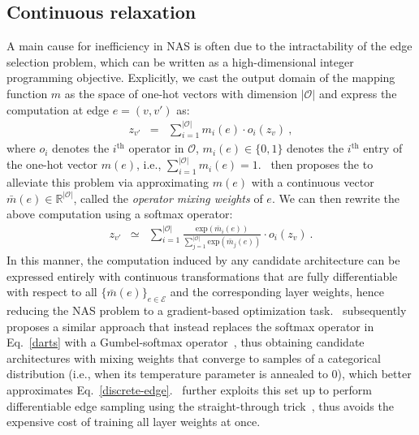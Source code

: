 \subsection{Continuous relaxation}
A main cause for inefficiency in NAS is often due to the intractability of the edge selection problem, which can be written as a high-dimensional integer programming objective. Explicitly, we cast the output domain of the mapping function $m$ as the space of one-hot vectors with dimension $|\mathcal{O}|$ and express the computation at edge $e=(v,v')$ as:
\begin{eqnarray}
z_{v'} &=& \sum_{i=1}^{|\mathcal{O}|} m_i(e) \cdot o_i(z_v) \ ,
\label{discrete-edge}
\end{eqnarray}
where $o_i$ denotes the $i^{\text{th}}$ operator in $\mathcal{O}$, $m_i(e) \in \{0, 1\}$ denotes the $i^{\text{th}}$ entry of the one-hot vector $m(e)$, i.e., $\sum_{i=1}^{|\mathcal{O}|} m_i(e) = 1$.~\citet{liu2018darts} then proposes the to alleviate this problem via approximating $m(e)$ with a continuous vector $\bar{m}(e) \in \mathbb{R}^{|\mathcal{O}|}$, called the \textit{operator mixing weights} of $e$. We can then rewrite the above computation using a softmax operator:
\begin{eqnarray}
z_{v'} &\simeq& \sum_{i=1}^{|\mathcal{O}|} \frac{\mathrm{exp}(\bar{m}_i(e))}{\sum_{j=1}^{|\mathcal{O}|}\mathrm{exp}(\bar{m}_j(e))} \cdot o_i(z_v) \ .
\label{darts}
\end{eqnarray}
In this manner, the computation induced by any candidate architecture can be expressed entirely with continuous transformations that are fully differentiable with respect to all $\{\bar{m}(e)\}_{e\in\mathcal{E}}$ and the corresponding layer weights, hence reducing the NAS problem to a gradient-based optimization task.~\citet{xie2018} subsequently proposes a similar approach that instead replaces the softmax operator in Eq.~\eqref{darts} with a Gumbel-softmax operator~\cite{jang2016}, thus obtaining candidate architectures with mixing weights that converge to samples of a categorical distribution (i.e., when its temperature parameter is annealed to $0$), which better approximates Eq.~\eqref{discrete-edge}. \citet{hu2020}~further exploits this set up to perform differentiable edge sampling using the straight-through trick~\cite{jang2016}, thus avoids the expensive cost of training all layer weights at once.

